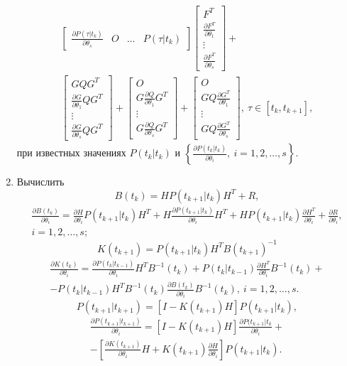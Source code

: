 \documentclass[a4paper,14pt]{extarticle}
\newcommand{\pd}[2]{\frac{\partial #1}{\partial #2}}
\newcommand{\inv}[1]{#1^{-1}}
\begin{document}
\begin{enumerate}
\begin{gather*}
\begin{bmatrix}
		\pd{P(\tau|t_k)}{\theta_s} & O & \ldots & P(\tau|t_k)
	\end{bmatrix}
	\begin{bmatrix}
		F^T \\
		\pd{F^T}{\theta_1} \\
		\vdots \\
		\pd{F^T}{\theta_s}
	\end{bmatrix} + \\
	\begin{bmatrix}
		G Q G^T \\
		\pd{G}{\theta_1} Q G^T \\
		\vdots \\
		\pd{G}{\theta_s} Q G^T 
	\end{bmatrix} +
	\begin{bmatrix}
		O \\
		G \pd{Q}{\theta_1} G^T \\
		\vdots \\
		G \pd{Q}{\theta_s} G^T
	\end{bmatrix} +
	\begin{bmatrix}
		O \\
		G Q \pd{G^T}{\theta_1} \\
		\vdots \\
		G Q \pd{G^T}{\theta_s}
	\end{bmatrix},\ \tau \in [t_k, t_{k+1}],
\end{gather*}
при известных значениях $P(t_k|t_k)$ и
	$\left\{ \pd{P(t_k| t_k)}{\theta_i},\ i = 1,2,\ldots,s \right\}$.

\item Вычислить
	\[
		B(t_k) = H P(t_{k+1}|t_k) H^T + R,
	\]
	\begin{align*}
		\pd{B(t_k)}{\theta_i} = \pd{H}{\theta_i} P(t_{k+1}|t_k) H^T + 
			H \pd{P(t_{k+1}|t_k)}{\theta_i} H^T + H P(t_{k+1}|t_k)
			\pd{H^T}{\theta_i} + \pd{R}{\theta_i}, \\
		i = 1,2,\ldots,s;
	\end{align*}
	\[
		K(t_{k+1}) = P(t_{k+1}|t_k) H^T \inv{B(t_{k+1})}
	\]
	\begin{multline*}
		\pd{K(t_k)}{\theta_i} = \pd{P(t_k|t_{k-1})}{\theta_i} H^T \inv{B}(t_k) +
			P(t_k|t_{k-1}) \pd{H^T}{\theta_i} \inv{B}(t_k) + \\ - P(t_k|t_{k-1}) H^T
			\inv{B}(t_k) \pd{B(t_k)}{\theta_i} \inv{B}(t_k),\ i = 1, 2, \ldots, s.
	\end{multline*}
	\[
		P(t_{k+1}|t_{k+1}) = [ I - K(t_{k+1}) H ] P(t_{k+1}|t_k),
	\]
	\begin{multline*}
		\pd{P(t_{k+1}|t_{k+1})}{\theta_i} =
			[ I - K(t_{k+1}) H ] \pd{P(t_{k+1}|t_k}{\theta_i} + \\ -
			\left[
				\pd{K(t_{k+1})}{\theta_i} H + K(t_{k+1}) \pd{H}{\theta_i}
			\right]
			P(t_{k+1}|t_k).
	\end{multline*}


\end{enumerate}
\end{document}

